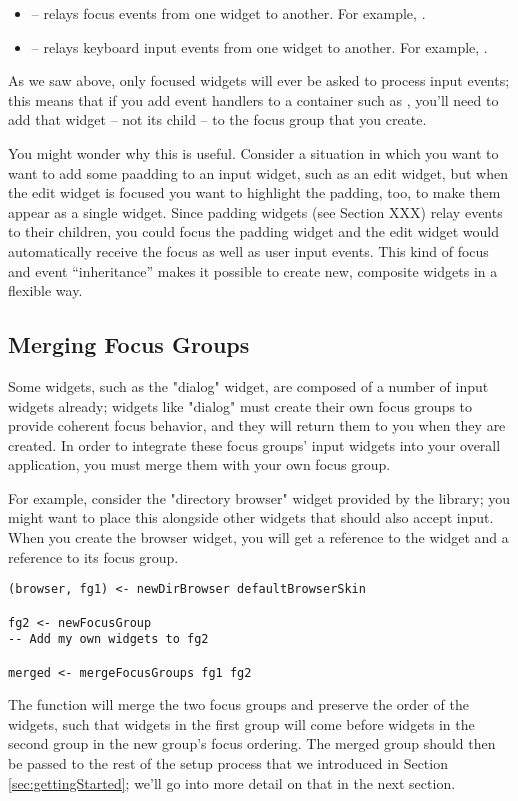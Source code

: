 \begin{itemize}
\item {} -- relays focus events from one widget to
  another.  For example, .
\item {} -- relays keyboard input events from one
  widget to another.  For example, .
\end{itemize}

As we saw above, only focused widgets will ever be asked to process
input events; this means that if you add event handlers to a container
such as , you'll need to add that widget -- not its child
-- to the focus group that you create.

You might wonder why this is useful.  Consider a situation in which
you want to want to add some paadding to an input widget, such as an
edit widget, but when the edit widget is focused you want to highlight
the padding, too, to make them appear as a single widget.  Since
padding widgets (see Section XXX) relay events to their children, you
could focus the padding widget and the edit widget would automatically
receive the focus as well as user input events.  This kind of focus
and event ``inheritance'' makes it possible to create new, composite
widgets in a flexible way.

\subsection{Merging Focus Groups}

Some widgets, such as the "dialog" widget, are composed of a number of
input widgets already; widgets like "dialog" must create their own
focus groups to provide coherent focus behavior, and they will return
them to you when they are created.  In order to integrate these focus
groups' input widgets into your overall application, you must merge
them with your own focus group.

For example, consider the "directory browser" widget provided by the
library; you might want to place this alongside other widgets that
should also accept input.  When you create the browser widget, you will
get a reference to the widget and a reference to its focus group.

\begin{verbatim}
(browser, fg1) <- newDirBrowser defaultBrowserSkin

fg2 <- newFocusGroup
-- Add my own widgets to fg2

merged <- mergeFocusGroups fg1 fg2
\end{verbatim}

The  function will merge the two focus groups and
preserve the order of the widgets, such that widgets in the first
group will come before widgets in the second group in the new group's
focus ordering.  The merged group should then be passed to the rest of
the setup process that we introduced in Section
\ref{sec:gettingStarted}; we'll go into more detail on that in the
next section.
